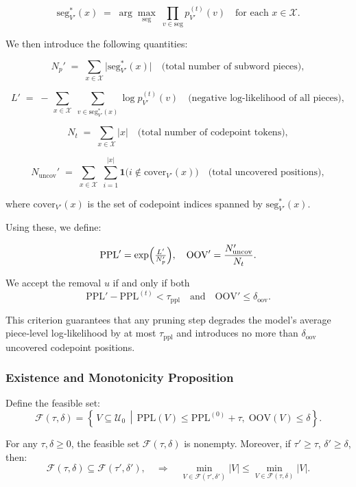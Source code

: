 \[
\mathrm{seg}^{*}_{V'}(x) \;=\;\arg\max_{\mathrm{seg}} \;\prod_{v\in\mathrm{seg}} p^{(t)}_{V'}(v)
\quad\text{for each }x\in\mathcal X.
\]

We then introduce the following quantities:

\[
N_{p}' \;=\;\sum_{x\in\mathcal X} \bigl|\mathrm{seg}^{*}_{V'}(x)\bigr|
\quad\text{(total number of subword pieces)},
\]

\[
L' \;=\; -\,\sum_{x\in\mathcal X}\;\sum_{v\in\mathrm{seg}^{*}_{V'}(x)}\log p^{(t)}_{V'}(v)
\quad\text{(negative log‐likelihood of all pieces)},
\]

\[
N_{t} \;=\;\sum_{x\in\mathcal X} |x|
\quad\text{(total number of codepoint tokens)},
\]

\[
N_{\mathrm{uncov}}' 
\;=\; \sum_{x\in\mathcal X}\;\sum_{i=1}^{|x|}
\mathbf1\bigl(i\not\in \mathrm{cover}_{V'}(x)\bigr)
\quad\text{(total uncovered positions)},
\]

where \(\mathrm{cover}_{V'}(x)\) is the set of codepoint indices spanned by \(\mathrm{seg}^{*}_{V'}(x)\).

Using these, we define:

\[
\mathrm{PPL}' 
= \exp\Bigl(\tfrac{L'}{N_{p}'}\Bigr),
\quad
\mathrm{OOV}' 
= \frac{N_{\mathrm{uncov}}'}{N_{t}}.
\]

We accept the removal \(u\) if and only if both
\[
\mathrm{PPL}' - \mathrm{PPL}^{(t)} < \tau_{\mathrm{ppl}}
\quad\text{and}\quad
\mathrm{OOV}' \le \delta_{\mathrm{oov}}.
\]

This criterion guarantees that any pruning step degrades the model’s average piece‐level log‐likelihood by at most \(\tau_{\mathrm{ppl}}\) and introduces no more than \(\delta_{\mathrm{oov}}\) uncovered codepoint positions.









\subsubsection{Existence and Monotonicity Proposition}

Define the feasible set:
\[
\mathcal F(\tau,\delta)
= \left\{\,V\subseteq\mathcal U_{0}\,\middle|\,
\mathrm{PPL}(V)\le \mathrm{PPL}^{(0)}+\tau,\;
\mathrm{OOV}(V)\le \delta
\right\}.
\]

\begin{proposition}
	For any \(\tau,\delta \ge 0\), the feasible set \(\mathcal F(\tau,\delta)\) is nonempty. Moreover, if \(\tau' \ge \tau\), \(\delta' \ge \delta\), then:
	\[
	\mathcal F(\tau,\delta) \subseteq \mathcal F(\tau',\delta'),
	\quad
	\Rightarrow
	\quad
	\min_{V\in\mathcal F(\tau',\delta')}|V| \le \min_{V\in\mathcal F(\tau,\delta)}|V|.
	\]
\end{proposition}

